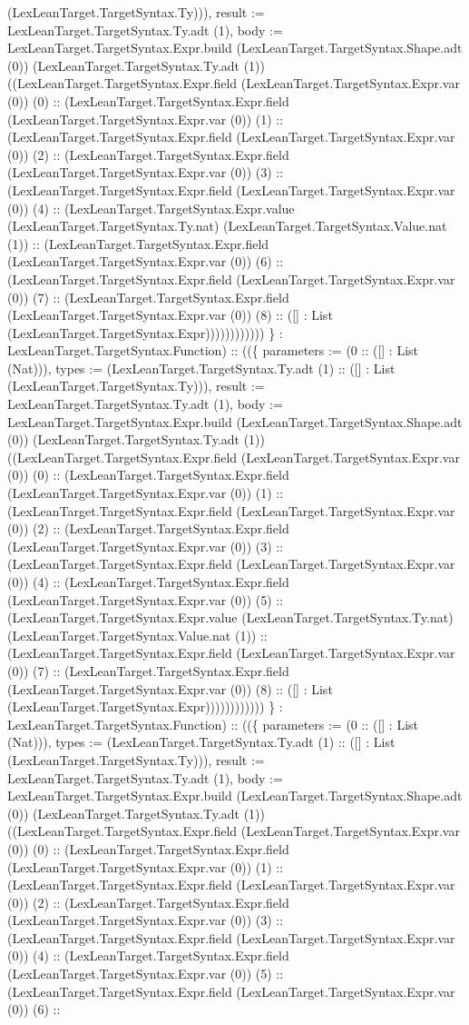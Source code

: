 \documentclass[11pt]{article}
\begin{document}
(LexLeanTarget.TargetSyntax.Ty))), result := LexLeanTarget.TargetSyntax.Ty.adt (1), body := LexLeanTarget.TargetSyntax.Expr.build (LexLeanTarget.TargetSyntax.Shape.adt (0)) (LexLeanTarget.TargetSyntax.Ty.adt (1)) ((LexLeanTarget.TargetSyntax.Expr.field (LexLeanTarget.TargetSyntax.Expr.var (0)) (0) :: (LexLeanTarget.TargetSyntax.Expr.field (LexLeanTarget.TargetSyntax.Expr.var (0)) (1) :: (LexLeanTarget.TargetSyntax.Expr.field (LexLeanTarget.TargetSyntax.Expr.var (0)) (2) :: (LexLeanTarget.TargetSyntax.Expr.field (LexLeanTarget.TargetSyntax.Expr.var (0)) (3) :: (LexLeanTarget.TargetSyntax.Expr.field (LexLeanTarget.TargetSyntax.Expr.var (0)) (4) :: (LexLeanTarget.TargetSyntax.Expr.value (LexLeanTarget.TargetSyntax.Ty.nat) (LexLeanTarget.TargetSyntax.Value.nat (1)) :: (LexLeanTarget.TargetSyntax.Expr.field (LexLeanTarget.TargetSyntax.Expr.var (0)) (6) :: (LexLeanTarget.TargetSyntax.Expr.field (LexLeanTarget.TargetSyntax.Expr.var (0)) (7) :: (LexLeanTarget.TargetSyntax.Expr.field (LexLeanTarget.TargetSyntax.Expr.var (0)) (8) :: ([] : List (LexLeanTarget.TargetSyntax.Expr)))))))))))) \} : LexLeanTarget.TargetSyntax.Function) :: ((\{ parameters := (0 :: ([] : List (Nat))), types := (LexLeanTarget.TargetSyntax.Ty.adt (1) :: ([] : List (LexLeanTarget.TargetSyntax.Ty))), result := LexLeanTarget.TargetSyntax.Ty.adt (1), body := LexLeanTarget.TargetSyntax.Expr.build (LexLeanTarget.TargetSyntax.Shape.adt (0)) (LexLeanTarget.TargetSyntax.Ty.adt (1)) ((LexLeanTarget.TargetSyntax.Expr.field (LexLeanTarget.TargetSyntax.Expr.var (0)) (0) :: (LexLeanTarget.TargetSyntax.Expr.field (LexLeanTarget.TargetSyntax.Expr.var (0)) (1) :: (LexLeanTarget.TargetSyntax.Expr.field (LexLeanTarget.TargetSyntax.Expr.var (0)) (2) :: (LexLeanTarget.TargetSyntax.Expr.field (LexLeanTarget.TargetSyntax.Expr.var (0)) (3) :: (LexLeanTarget.TargetSyntax.Expr.field (LexLeanTarget.TargetSyntax.Expr.var (0)) (4) :: (LexLeanTarget.TargetSyntax.Expr.field (LexLeanTarget.TargetSyntax.Expr.var (0)) (5) :: (LexLeanTarget.TargetSyntax.Expr.value (LexLeanTarget.TargetSyntax.Ty.nat) (LexLeanTarget.TargetSyntax.Value.nat (1)) :: (LexLeanTarget.TargetSyntax.Expr.field (LexLeanTarget.TargetSyntax.Expr.var (0)) (7) :: (LexLeanTarget.TargetSyntax.Expr.field (LexLeanTarget.TargetSyntax.Expr.var (0)) (8) :: ([] : List (LexLeanTarget.TargetSyntax.Expr)))))))))))) \} : LexLeanTarget.TargetSyntax.Function) :: ((\{ parameters := (0 :: ([] : List (Nat))), types := (LexLeanTarget.TargetSyntax.Ty.adt (1) :: ([] : List (LexLeanTarget.TargetSyntax.Ty))), result := LexLeanTarget.TargetSyntax.Ty.adt (1), body := LexLeanTarget.TargetSyntax.Expr.build (LexLeanTarget.TargetSyntax.Shape.adt (0)) (LexLeanTarget.TargetSyntax.Ty.adt (1)) ((LexLeanTarget.TargetSyntax.Expr.field (LexLeanTarget.TargetSyntax.Expr.var (0)) (0) :: (LexLeanTarget.TargetSyntax.Expr.field (LexLeanTarget.TargetSyntax.Expr.var (0)) (1) :: (LexLeanTarget.TargetSyntax.Expr.field (LexLeanTarget.TargetSyntax.Expr.var (0)) (2) :: (LexLeanTarget.TargetSyntax.Expr.field (LexLeanTarget.TargetSyntax.Expr.var (0)) (3) :: (LexLeanTarget.TargetSyntax.Expr.field (LexLeanTarget.TargetSyntax.Expr.var (0)) (4) :: (LexLeanTarget.TargetSyntax.Expr.field (LexLeanTarget.TargetSyntax.Expr.var (0)) (5) :: (LexLeanTarget.TargetSyntax.Expr.field (LexLeanTarget.TargetSyntax.Expr.var (0)) (6) :: 
\end{document}
